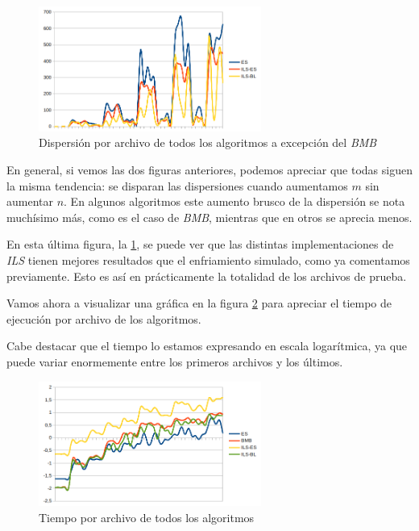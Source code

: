 \begin{figure}[H]
    \centering
    \includegraphics[width=0.65\textwidth]{"data/disp_mejores.png"}
    \caption{Dispersión por archivo de todos los algoritmos a excepción del \textit{BMB}}
    \label{fig:disp_mejores}
\end{figure}

En general, si vemos las dos figuras anteriores, podemos apreciar que todas siguen la misma tendencia: se disparan las dispersiones cuando aumentamos $m$ sin aumentar $n$.
En algunos algoritmos este aumento brusco de la dispersión se nota muchísimo más, como es el caso de \textit{BMB}, mientras que en otros se aprecia menos.

En esta última figura, la \ref{fig:disp_mejores}, se puede ver que las distintas implementaciones de \textit{ILS} tienen mejores resultados que el enfriamiento simulado, como ya comentamos previamente. Esto es así en prácticamente la totalidad de los archivos de prueba.


Vamos ahora a visualizar una gráfica en la figura \ref{fig:tiempoTodos} para apreciar el tiempo de ejecución por archivo de los algoritmos.

Cabe destacar que el tiempo lo estamos expresando en escala logarítmica, ya que puede variar enormemente entre los primeros archivos y los últimos.

\begin{figure}[H]
    \centering
    \includegraphics[width=0.65\textwidth]{"data/tiempo_todos.png"}
    \caption{Tiempo por archivo de todos los algoritmos}
    \label{fig:tiempoTodos}
\end{figure}

